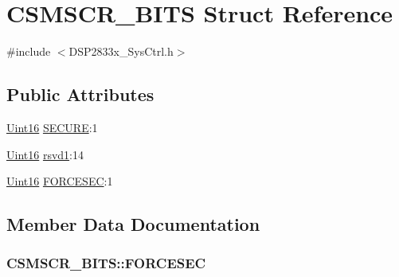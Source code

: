 \hypertarget{struct_c_s_m_s_c_r___b_i_t_s}{}\section{C\+S\+M\+S\+C\+R\+\_\+\+B\+I\+T\+S Struct Reference}
\label{struct_c_s_m_s_c_r___b_i_t_s}


{\ttfamily \#include $<$D\+S\+P2833x\+\_\+\+Sys\+Ctrl.\+h$>$}

\subsection*{Public Attributes}
\begin{DoxyCompactItemize}
\item 
\hyperlink{_d_s_p2833x___device_8h_a59a9f6be4562c327cbfb4f7e8e18f08b}{Uint16} \hyperlink{struct_c_s_m_s_c_r___b_i_t_s_af9a8d39bcfe9f90add69b261eb25b795}{S\+E\+C\+U\+R\+E}\+:1
\item 
\hyperlink{_d_s_p2833x___device_8h_a59a9f6be4562c327cbfb4f7e8e18f08b}{Uint16} \hyperlink{struct_c_s_m_s_c_r___b_i_t_s_a231f9bcb4cec686eda3df920afc80b3a}{rsvd1}\+:14
\item 
\hyperlink{_d_s_p2833x___device_8h_a59a9f6be4562c327cbfb4f7e8e18f08b}{Uint16} \hyperlink{struct_c_s_m_s_c_r___b_i_t_s_aa410b0a58e542d686621a910c633e241}{F\+O\+R\+C\+E\+S\+E\+C}\+:1
\end{DoxyCompactItemize}


\subsection{Member Data Documentation}
\hypertarget{struct_c_s_m_s_c_r___b_i_t_s_aa410b0a58e542d686621a910c633e241}{}
\subsubsection[{F\+O\+R\+C\+E\+S\+E\+C}]{ C\+S\+M\+S\+C\+R\+\_\+\+B\+I\+T\+S\+::\+F\+O\+R\+C\+E\+S\+E\+C}\label{struct_c_s_m_s_c_r___b_i_t_s_aa410b0a58e542d686621a910c633e241}
\hypertarget{struct_c_s_m_s_c_r___b_i_t_s_a231f9bcb4cec686eda3df920afc80b3a}{}
